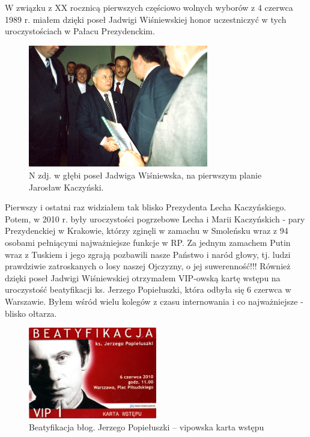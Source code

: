 W związku z XX rocznicą pierwszych częściowo wolnych wyborów z 4 czerwca 1989 r. miałem dzięki poseł Jadwigi Wiśniewskiej honor uczestniczyć w tych uroczystościach w Pałacu Prezydenckim.
\begin{figure}[!h]
\begin{center}
\includegraphics[width=0.7\textwidth]{photo/jaroslaw_kaczynski.jpg}
\caption[Jadwiga Wiśniewska]{N zdj. w głębi poseł Jadwiga Wiśniewska, na pierwszym planie Jarosław Kaczyński.}
\end{center}
\end{figure}

Pierwszy i ostatni raz widziałem tak blisko Prezydenta Lecha Kaczyńskiego. Potem, w 2010 r. były uroczystości pogrzebowe Lecha i Marii Kaczyńskich - pary Prezydenckiej w Krakowie, którzy zginęli w zamachu w Smoleńsku wraz z 94 osobami pełniącymi najważniejsze funkcje w RP. Za jednym zamachem Putin wraz z Tuskiem i jego zgrają pozbawili nasze Państwo i naród głowy, tj. ludzi prawdziwie zatroskanych o losy naszej Ojczyzny, o jej suwerenność!!! Również dzięki poseł Jadwigi Wiśniewskiej otrzymałem VIP-owską kartę wstępu na uroczystość beatyfikacji ks. Jerzego Popiełuszki, która odbyła się 6 czerwca w Warszawie. Byłem wśród wielu kolegów z czasu internowania i co najważniejsze - blisko ołtarza.
\begin{figure}[!h]
\begin{center}
\includegraphics[width=0.5\textwidth]{photo/beatyfikacja_popieluszki_karta_wstepu.jpg}
\caption[Karta vipowska]{Beatyfikacja błog. Jerzego Popiełuszki -- vipowska karta wstępu}
\end{center}
\end{figure}

